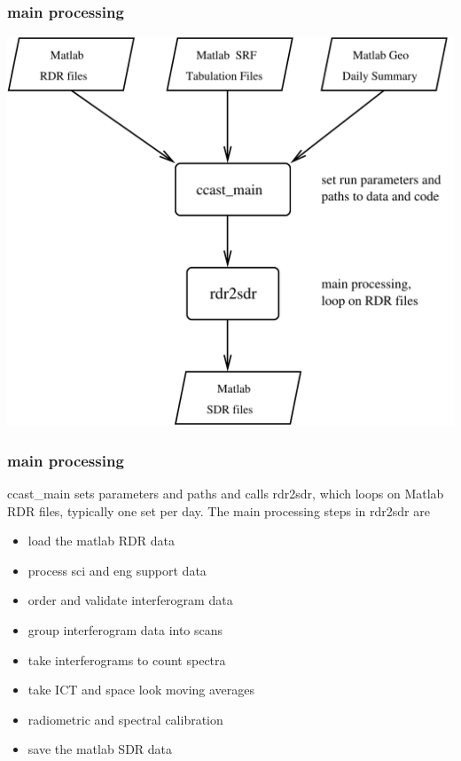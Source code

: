 \documentclass[11pt]{beamer}
\begin{document}
\begin{frame}
\frametitle{main processing}

\begin{center}
  \includegraphics[scale=0.4]{figures/mainpro.pdf}
\end{center}

\end{frame}
\begin{frame}
\frametitle{main processing}

ccast\_main sets parameters and paths and calls rdr2sdr, which loops
on Matlab RDR files, typically one set per day.  The main processing
steps in rdr2sdr are

\begin{itemize}
  \item load the matlab RDR data
  \item process sci and eng support data
  \item order and validate interferogram data
  \item group interferogram data into scans
  \item take interferograms to count spectra
  \item take ICT and space look moving averages
  \item radiometric and spectral calibration
  \item save the matlab SDR data
\end{itemize}

\end{frame}
\end{document}
